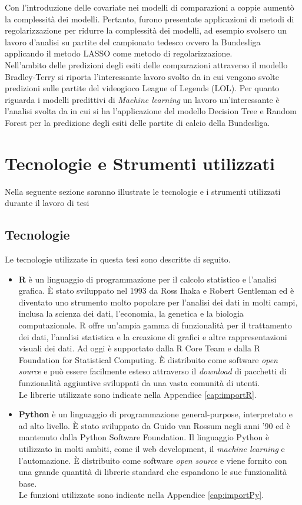 Con l'introduzione delle covariate nei modelli di comparazioni a coppie aumentò la complessità dei modelli. Pertanto, furono presentate applicazioni di metodi di regolarizzazione per ridurre la complessità dei modelli, ad esempio \textcite{schauberger2019btllasso} svolsero un lavoro d'analisi su partite del campionato tedesco ovvero la Bundesliga applicando il metodo LASSO come metodo di regolarizzazione.\\
Nell'ambito delle predizioni degli esiti delle comparazioni attraverso il modello Bradley-Terry si riporta l’interessante lavoro svolto da \textcite{kang2015poisson} in cui vengono svolte predizioni sulle partite del videogioco League of Legends (LOL). Per quanto riguarda i modelli predittivi di \emph{Machine learning} un lavoro un'interessante è l'analisi svolta da \textcite{xu2021prediction} in cui si ha l'applicazione del modello Decision Tree e Random Forest per la predizione degli esiti delle partite di calcio della Bundesliga.

\section{Tecnologie e Strumenti utilizzati}
Nella seguente sezione saranno illustrate le tecnologie e i strumenti utilizzati durante il lavoro di tesi 
\subsection{Tecnologie}
Le tecnologie utilizzate in questa tesi sono descritte di seguito.
\begin{itemize}
	\item \textbf{R} \autocite{R-language} è un linguaggio di programmazione per il calcolo statistico e l'analisi grafica. È stato sviluppato nel 1993 da Ross Ihaka e Robert Gentleman ed è diventato uno strumento molto popolare per l'analisi dei dati in molti campi, inclusa la scienza dei dati, l'economia, la genetica e la biologia computazionale. R offre un'ampia gamma di funzionalità per il trattamento dei dati, l'analisi statistica e la creazione di grafici e altre rappresentazioni visuali dei dati. Ad oggi è supportato dalla R Core Team e dalla R Foundation for Statistical Computing. È distribuito come software \emph{open source} e può essere facilmente esteso attraverso il \emph{download} di pacchetti di funzionalità aggiuntive sviluppati da una vasta comunità di utenti.\\
	Le librerie utilizzate sono indicate nella Appendice \ref{cap:importR}.
	\item \textbf{Python} \autocite{van2003introduction} è un linguaggio di programmazione general-purpose, interpretato e ad alto livello. È stato sviluppato da Guido van Rossum negli anni '90 ed è mantenuto dalla Python Software Foundation. Il linguaggio Python è utilizzato in molti ambiti, come il web development, il\emph{ machine learning} e l'automazione. È distribuito come software \emph{open source} e viene fornito con una grande quantità di librerie standard che espandono le sue funzionalità base.\\
	Le funzioni utilizzate sono indicate nella Appendice \ref{cap:importPy}.
\end{itemize}


